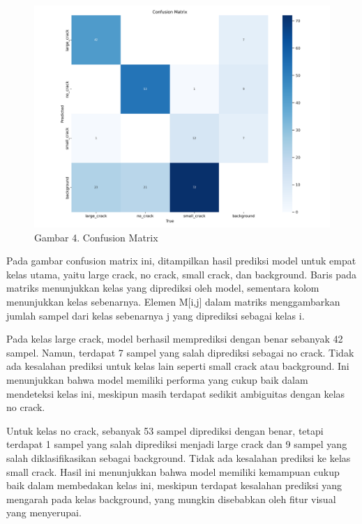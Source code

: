 \documentclass[12pt,a4paper]{article}
\begin{document}
\begin{adjustwidth}{3em}{0pt}
\begin{figure}[h]
    \centering
    \includegraphics[width=0.8\linewidth]{Images/confusion_matrix.png}
    \caption*{Gambar 4. Confusion Matrix}
    \label{fig:enter-label}
\end{figure}
\hspace{0.5cm} Pada gambar confusion matrix ini, ditampilkan hasil prediksi model untuk empat kelas utama, yaitu large crack, no crack, small crack, dan background. Baris pada matriks menunjukkan kelas yang diprediksi oleh model, sementara kolom menunjukkan kelas sebenarnya. Elemen M[i,j] dalam matriks menggambarkan jumlah sampel dari kelas sebenarnya j yang diprediksi sebagai kelas i.

\hspace{0.5cm} Pada kelas large crack, model berhasil memprediksi dengan benar sebanyak 42 sampel. Namun, terdapat 7 sampel yang salah diprediksi sebagai no crack. Tidak ada kesalahan prediksi untuk kelas lain seperti small crack atau background. Ini menunjukkan bahwa model memiliki performa yang cukup baik dalam mendeteksi kelas ini, meskipun masih terdapat sedikit ambiguitas dengan kelas no crack.

\hspace{0.5cm} Untuk kelas no crack, sebanyak 53 sampel diprediksi dengan benar, tetapi terdapat 1 sampel yang salah diprediksi menjadi large crack dan 9 sampel yang salah diklasifikasikan sebagai background. Tidak ada kesalahan prediksi ke kelas small crack. Hasil ini menunjukkan bahwa model memiliki kemampuan cukup baik dalam membedakan kelas ini, meskipun terdapat kesalahan prediksi yang mengarah pada kelas background, yang mungkin disebabkan oleh fitur visual yang menyerupai.


\end{adjustwidth}
\end{document}
